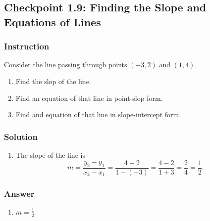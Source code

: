 \subsection*{Checkpoint 1.9: Finding the Slope and Equations of Lines}

\subsubsection*{Instruction}

Consider the line passing through points  $ (-3,2) $ and  $ (1,4) $.

\begin{enumerate}[label = (\alph*)]
  \item
    Find the slop of the line.
  \item
    Find an equation of that line in point-slop form.
  \item
    Find and equation of that line in slope-intercept form.
\end{enumerate}

\subsubsection*{Solution}

\begin{enumerate}[label = (\alph*)]
  \item
    The slope of the line is
    $$ \phantom{.}
    m = \frac{y_2 - y_1}{x_2 - x_1} = \frac{4 - 2}{1 - (-3)} = \frac{4 - 2}{1 + 3} = \frac{2}{4} = \frac{1}{2}
    .$$
\end{enumerate}

\subsubsection{Answer}

\begin{enumerate}[label = (\alph*)]
  \item
    $ m = \frac{1}{2} $
\end{enumerate}
